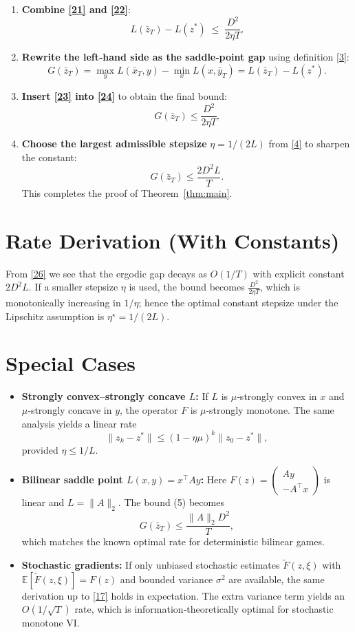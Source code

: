 \documentclass{article}
\newcommand{\EE}{\mathbb{E}}
\begin{document}
\begin{enumerate}[label=[Step \arabic*], leftmargin=*, itemsep=2mm]
\item \textbf{Combine \eqref{21} and \eqref{22}}:
\[
L(\bar z_T)-L(z^*)\;\le\;\frac{D^{2}}{2\eta T}.
\tag{23}
\]

\item \textbf{Rewrite the left‑hand side as the saddle‑point gap}
using definition \eqref{3}:
\[
G(\bar z_T)=\max_{y}L(\bar x_T,y)-\min_{x}L(x,\bar y_T)
           =L(\bar z_T)-L(z^*).
\tag{24}
\]

\item \textbf{Insert \eqref{23} into \eqref{24}} to obtain the final bound:
\[
G(\bar z_T)\le \frac{D^{2}}{2\eta T}.
\tag{25}
\]

\item \textbf{Choose the largest admissible stepsize} $\eta=1/(2L)$
from \eqref{4} to sharpen the constant:
\[
G(\bar z_T)\le \frac{2D^{2}L}{T}.
\tag{26}
\]
This completes the proof of Theorem~\ref{thm:main}.
\end{enumerate}

\section*{Rate Derivation (With Constants)}
From \eqref{26} we see that the ergodic gap decays as $O(1/T)$ with
explicit constant $2D^{2}L$.  If a smaller stepsize $\eta$ is used,
the bound becomes $\frac{D^{2}}{2\eta T}$, which is monotonically increasing
in $1/\eta$; hence the optimal constant stepsize under the Lipschitz
assumption is $\eta^\star=1/(2L)$.

\section*{Special Cases}
\begin{itemize}[leftmargin=*,noitemsep]
\item \textbf{Strongly convex–strongly concave $L$:}
If $L$ is $\mu$‑strongly convex in $x$ and $\mu$‑strongly concave in $y$,
the operator $F$ is $\mu$‑strongly monotone.  The same analysis yields a
linear rate
\[
\|z_k-z^*\|\le (1-\eta\mu)^{k}\|z_0-z^*\|,
\]
provided $\eta\le 1/L$.
\item \textbf{Bilinear saddle point $L(x,y)=x^\top Ay$:}
Here $F(z)=\begin{pmatrix}Ay\\-A^\top x\end{pmatrix}$ is linear and
$L=\|A\|_{2}$.  The bound (5) becomes
\[
G(\bar z_T)\le \frac{\|A\|_{2}D^{2}}{T},
\]
which matches the known optimal rate for deterministic bilinear games.
\item \textbf{Stochastic gradients:}
If only unbiased stochastic estimates $\tilde F(z,\xi)$ with
$\EE[\tilde F(z,\xi)]=F(z)$ and bounded variance $\sigma^{2}$ are
available, the same derivation up to \eqref{17} holds in expectation.
The extra variance term yields an $O(1/\sqrt{T})$ rate, which is
information‑theoretically optimal for stochastic monotone VI.
\end{itemize}
\end{document}
